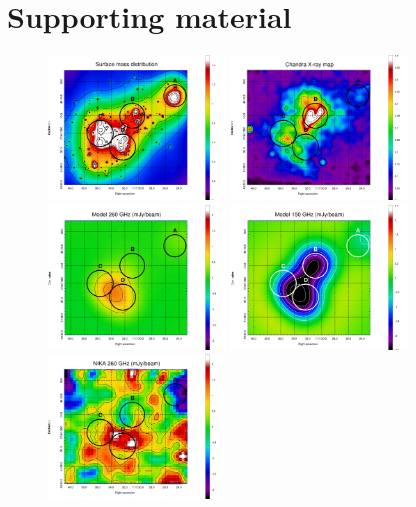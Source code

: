 \documentclass[11pt,a4paper,twoside,graphicx,color]{article}
\begin{document}
\section{Supporting material}
\begin{figure}[h!]
	\centering
	\includegraphics[width=0.42\textwidth]{Lensing.pdf}
	\includegraphics[width=0.42\textwidth]{Xray.pdf}
	\includegraphics[width=0.42\textwidth]{Model1mm.pdf}
	\includegraphics[width=0.42\textwidth]{Model2mm.pdf}
	\includegraphics[width=0.42\textwidth]{NIKA1mm.pdf}

\end{figure}
\end{document}
